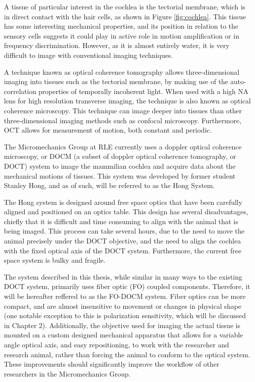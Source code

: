 A tissue of particular interest in the cochlea is the tectorial membrane, which is in direct contact with the hair cells, as shown in Figure \ref{fig:cochlea}. This tissue has some interesting mechanical properties, and its position in relation to the sensory cells suggests it could play in active role in motion amplification or in frequency discrimination. However, as it is almost entirely water, it is very difficult to image with conventional imaging techniques. \cite{needcitation}

A technique known as optical coherence tomography allows three-dimensional imaging into tissues such as the tectorial membrane, by making use of the auto-correlation properties of temporally incoherent light. When used with a high NA lens for high resolution transverse imaging, the technique is also known as optical coherence microscopy. This technique can image deeper into tissues than other three-dimensional imaging methods such as confocal microscopy. Furthermore, OCT allows for measurement of motion, both constant and periodic. \cite{DrexlerBook}

The Micromechanics Group at RLE currently uses a doppler optical coherence microscopy, or DOCM (a subset of doppler optical coherence tomography, or DOCT) system to image the mammilian cochlea and acquire data about the mechanical motions of tissues. This system was developed by former student Stanley Hong, and as of such, will be referred to as the Hong System. \cite{hong}

The Hong system is designed around free space optics that have been carefully aligned and positioned on an optics table. This design has several disadvantages, chiefly that it is difficult and time consuming to align with the animal that is being imaged. This process can take several hours, due to the need to move the animal precisely under the DOCT objective, and the need to align the cochlea with the fixed optical axis of the DOCT system. Furthermore, the current free space system is bulky and fragile.

The system described in this thesis, while similar in many ways to the existing DOCT system, primarily uses fiber optic (FO) coupled components. Therefore, it will be hereafter reffered to as the FO-DOCM system. Fiber optics can be more compact, and are almost insensitive to movement or changes in physical shape (one notable exception to this is polarization sensitivity, which will be discussed in Chapter 2). Additionally, the objective used for imaging the actual tissue is mounted on a custom designed mechanical apparatus that allows for a variable angle optical axis, and easy repositioning, to work with the researcher and research animal, rather than forcing the animal to conform to the optical system. These improvements should significantly improve the workflow of other researchers in the Micromechanics Group.

